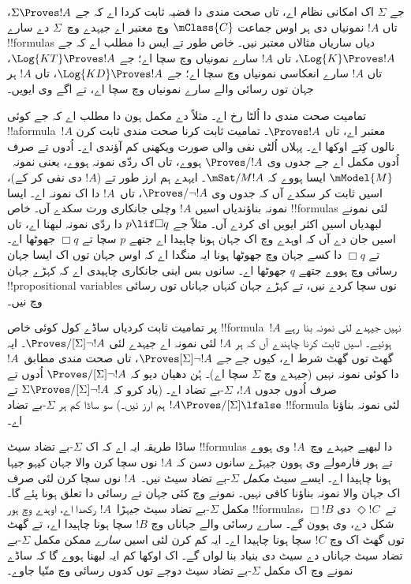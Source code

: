 \documentclass[../../../include/open-logic-section]{subfiles}
\begin{document}


جے $\Sigma$ اک امکانی نظام اے، تاں صحت مندی دا قضیہ ثابت کردا اے کہ جے $\Sigma \Proves !A$، تاں $!A$ نمونیاں دی ہر اوس جماعت
$\mClass{C}$ وچ معتبر اے جیہدے وچ~$\Sigma$ دے سارے !!{formula}s دیاں ساریاں مثالاں معتبر نیں۔ خاص طور تے ایس دا مطلب اے کہ جے $\Log{K}
\Proves !A$، تاں $!A$ سارے نمونیاں وچ سچا اے؛ جے $\Log{KT} \Proves !A$،
تاں $!A$ سارے انعکاسی نمونیاں وچ سچا اے؛ جے $\Log{KD} \Proves !A$،
تاں $!A$ ہر جہان توں رسائی والے سارے نمونیاں وچ سچا اے، تے اگے وی ایویں۔

تمامیت صحت مندی دا اُلٹا رخ اے۔ مثلاً  دے مکمل ہون دا مطلب اے کہ جے کوئی !!a{formula}~$!A$ معتبر اے، تاں $\Proves !A$۔
تمامیت ثابت کرنا صحت مندی ثابت کرن نالوں کِتے اوکھا اے۔ پہلاں اُلٹی نفی والی صورت ویکھنی کم آؤندی اے۔  اُدوں تے صرف اُدوں مکمل اے جے جدوں وی $\Proves/ !A$ ہووے، تاں اک ردّی نمونہ ہووے، یعنی نمونہ~$\mModel{M}$ ایسا ہووے کہ $\mSat/{M}{!A}$۔ ایہدے ہم ارز طور تے ($!A$ دی نفی کر کے)، اسیں ثابت کر سکدے آں کہ جدوں وی $\Proves/ \lnot !A$، تاں~$!A$ دا اک نمونہ اے۔ ایسا نمونہ بناؤندیاں اسیں $!A$ وچلی جانکاری ورت سکدے آں۔ خاص !!{formula}s لئی نمونے لبھدیاں اسیں اکثر ایویں ای کردے آں۔ مثلاً جے $p \lif \Box q$ دا ردّی نمونہ لبھنا اے، تاں اسیں جان دے آں کہ اوہدے وچ اک جہان ہونا چاہیدا اے جتھے $p$ سچا تے $\Box q$ جھوٹھا اے۔ تے $\Box
q$ دا کسے جہان وچ جھوٹھا ہونا ایہ منگدا اے کہ اوس جہان توں اک ایسا جہان رسائی وچ ہووے جتھے $q$ جھوٹھا اے۔ سانوں بس اینی جانکاری چاہیدی اے کہ کہڑے جہان !!{propositional variable}s نوں سچا کردے نیں، تے کہڑے جہان کنہاں جہاناں توں رسائی وچ نیں۔

پر تمامیت ثابت کردیاں ساڈے کول کوئی خاص !!{formula}~$!A$ نہیں جیہدے لئی نمونہ بنا رہے ہوئیے۔ اسیں ثابت کرنا چاہندے آں کہ ہر $!A$ لئی نمونہ اے جیہدے لئی
$\Proves/[\Sigma] \lnot !A$۔ ایہ گھٹ توں گھٹ شرط اے، کیوں جے
\emph{جے} $\Proves[\Sigma] \lnot !A$، تاں صحت مندی مطابق~$!A$ دا کوئی نمونہ نہیں (جیہدے وچ $\Sigma$ سچا اے)۔ ہُن دھیان دیو کہ $\Proves/[\Sigma]
\lnot !A$ اُدوں تے صرف اُدوں جدوں $!A$، $\Sigma$-بے تضاد اے۔ (یاد کرو کہ $\Sigma
\Proves/[\Sigma] \lnot !A$ تے $!A \Proves/[\Sigma] \lfalse$ ہم ارز نیں۔) سو ساڈا کم ہر $\Sigma$-بے تضاد !!{formula} لئی نمونہ بناؤنا اے۔

ساڈا طریقہ ایہ اے کہ اک $\Sigma$-بے تضاد سیٹ !!{formula}s دا لبھیے جیہدے وچ~$!A$ وی ہووے تے ہور فارمولے وی ہوون جیہڑے سانوں دسن کہ $!A$ نوں سچا کرن والا جہان کیہو جیہا ہونا چاہیدا اے۔ ایسے سیٹ \emph{مکمل} $\Sigma$-بے تضاد سیٹ نیں۔~$!A$ نوں سچا کرن لئی صرف اک جہان والا نمونہ بناؤنا کافی نہیں۔ نمونے وچ کئی جہان تے رسائی دا تعلق ہونا پئے گا۔مکمل $\Sigma$-بے تضاد سیٹ جیہڑا~$!A$ رکھدا اے، اوہدے وچ ہور !!{formula}s، $\Box !B$ تے~$\Diamond !C$ دی شکل دے، وی ہوون گے۔ سارے رسائی والے جہاناں وچ $!B$ سچا ہونا چاہیدا اے، تے گھٹ توں گھٹ اک وچ $!C$ سچا ہونا چاہیدا اے۔ ایہ کم کرن لئی اسیں \emph{سارے} ممکن مکمل $\Sigma$-بے تضاد سیٹ جہاناں دے سیٹ دی بنیاد بنا لواں گے۔ اک اوکھا کم ایہ لبھنا ہووے گا کہ ساڈے نمونے وچ اک مکمل $\Sigma$-بے تضاد سیٹ دوجے توں کدوں رسائی وچ منّیا جاوے۔
\end{document}
